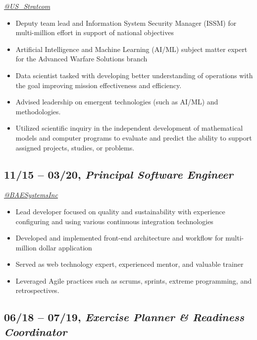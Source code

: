 \documentclass[10pt]{article}
\def\tightlist{}
\begin{document}
\emph{\href{https://twitter.com/US_Stratcom}{@US\_Stratcom}}

\begin{itemize}
\tightlist
\item
  Deputy team lead and Information System Security Manager (ISSM) for
  multi-million effort in support of national objectives
\item
  Artificial Intelligence and Machine Learning (AI/ML) subject matter
  expert for the Advanced Warfare Solutions branch
\item
  Data scientist tasked with developing better understanding of
  operations with the goal improving mission effectiveness and
  efficiency.
\item
  Advised leadership on emergent technologies (such as AI/ML) and
  methodologies.
\item
  Utilized scientific inquiry in the independent development of
  mathematical models and computer programs to evaluate and predict the
  ability to support assigned projects, studies, or problems.
\end{itemize}

\hypertarget{principal-software-engineer}{%
\subsection{\texorpdfstring{11/15 -- 03/20, \textbf{\emph{Principal
Software
Engineer}}}{11/15 -- 03/20, Principal Software Engineer}}\label{principal-software-engineer}}

\emph{\href{https://twitter.com/BAESystemsInc}{@BAESystemsInc}}

\begin{itemize}
\tightlist
\item
  Lead developer focused on quality and sustainability with experience
  configuring and using various continuous integration technologies
\item
  Developed and implemented front-end architecture and workflow for
  multi-million dollar application
\item
  Served as web technology expert, experienced mentor, and valuable
  trainer
\item
  Leveraged Agile practices such as scrums, sprints, extreme
  programming, and retrospectives.
\end{itemize}

\hypertarget{exercise-planner-readiness-coordinator}{%
\subsection{\texorpdfstring{06/18 -- 07/19, \textbf{\emph{Exercise
Planner \& Readiness
Coordinator}}}{06/18 -- 07/19, Exercise Planner \& Readiness Coordinator}}\label{exercise-planner-readiness-coordinator}}
\end{document}
